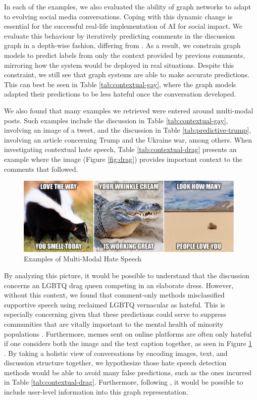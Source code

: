 \documentclass[letterpaper]{article} %
\newcommand{\edit}[1]{{#1}}
\begin{document}
In each of the examples, we also evaluated the ability of graph networks to adapt to evolving social media conversations. Coping with this dynamic change is essential for the successful real-life implementation of AI for social impact. We evaluate this behaviour by iteratively predicting comments in the discussion graph in a depth-wise fashion, differing from \citet{hebert2022predicting}. As a result, we constrain graph models to predict labels from only the context provided by previous comments, mirroring how the system would be deployed in real situations. Despite this constraint, we still see that graph systems are able to make accurate predictions. This can best be seen in Table \ref{tab:contextual-gay}, where the graph models adapted their predictions to be less hateful once the conversation developed.

We also found that many examples we retrieved were entered around multi-modal posts. Such examples include the discussion in Table \ref{tab:contextual-gay}, involving an image of a tweet, and the discussion in Table \ref{tab:predictive-trump}, involving an article concerning Trump and the Ukraine war, among others. When investigating contextual hate speech, Table \ref{tab:contextual-drag} presents an example where the image (Figure \ref{fig:drag}) provides important context to the comments that followed.

\begin{figure}
    \centering
    \includegraphics[width=\linewidth]{hatefulmemes.png}
    \caption{Examples of Multi-Modal Hate Speech}
    \label{fig:multimodal}
\end{figure}

By analyzing this picture, it would be possible to understand that the discussion concerns an LGBTQ drag queen competing in an elaborate dress. However, without this context, we found that comment-only methods misclassified supportive speech using reclaimed LGBTQ vernacular as hateful. This is especially concerning given that these predictions could serve to suppress communities that are vitally important to the mental health of minority populations \cite{lucero2017safe, fish2020stuck}. Furthermore, memes sent on online platforms are often only hateful if one considers both the image and the text caption together, as seen in Figure \ref{fig:multimodal} \cite{kiela2020hateful}. By taking a holistic view of conversations by encoding images, text, and discussion structure together, we hypothesize those hate speech detection methods would be able to avoid many false predictions, such as the ones incurred in Table \ref{tab:contextual-drag}. \edit{Furthermore, following \citet{tian-etal-2022-duck}, it would be possible to include user-level information into this graph representation.}
\end{document}
